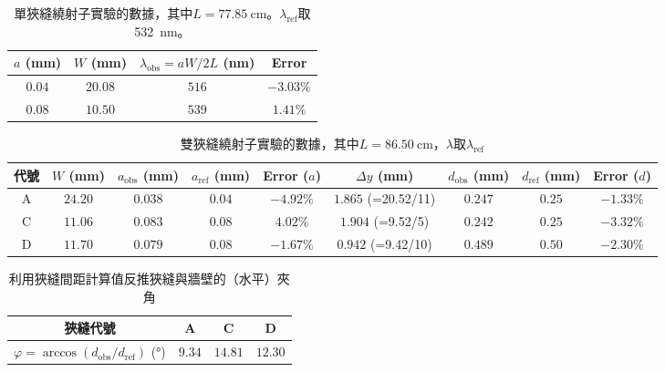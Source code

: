 \begin{table}[htb!]
\centering
\caption{單狹縫繞射子實驗的數據，其中$L= \qty{77.85}{\cm}$。$\lambda_{\text{ref}}$取 \qty{532}{\nm}。}
\begin{tabular}{cccc}
\toprule
$a$ (\unit{\mm}) & $W$ (\unit{\mm}) & $\lambda_{\text{obs}}=aW/2L$ (\unit{\nm}) & Error \\
\midrule
$0.04$ & $20.08$ & $516$ & $-3.03\%$ \\
$0.08$ & $10.50$ & $539$ & $1.41\%$ \\
\bottomrule
\end{tabular}
\end{table}
\begin{table}[htb!]
\centering
\caption{雙狹縫繞射子實驗的數據，其中$L= \qty{86.50}{\cm}$，$\lambda$取$\lambda_{\text{ref}}$}
\begin{tabular}{ccccccccc}
\toprule
代號 & $W$ (\unit{\mm}) & $a_{\text{obs}}$ (\unit{\mm}) & $a_{\text{ref}}$ (\unit{\mm}) & Error ($a$) & $\Delta y$ (\unit{\mm}) & $d_{\text{obs}}$ (\unit{\mm}) & $d_{\text{ref}}$ (\unit{\mm}) & Error ($d$) \\
\midrule
A & $24.20$ & $0.038$ & $0.04$ & $-4.92\%$ & $1.865$ (=20.52/11) & $0.247$ & $0.25$ & $-1.33\%$ \\
C & $11.06$ & $0.083$ & $0.08$ & $4.02\%$ & $1.904$ (=9.52/5) & $0.242$ & $0.25$ & $-3.32\%$ \\
D & $11.70$ & $0.079$ & $0.08$ & $-1.67\%$ & $0.942$ (=9.42/10) & $0.489$ & $0.50$ & $-2.30\%$ \\
\bottomrule
\end{tabular}
\end{table}
\begin{table}[htb!]
\centering
\caption{利用狹縫間距計算值反推狹縫與牆壁的（水平）夾角}
\begin{tabular}{cccc}
\toprule
狹縫代號 & A & C & D \\
\midrule
$\varphi=\arccos(d_{\text{obs}}/d_{\text{ref}})$ (\unit{\degree}) & $9.34$ & $14.81$ & $12.30$ \\
\bottomrule
\end{tabular}
\end{table}
